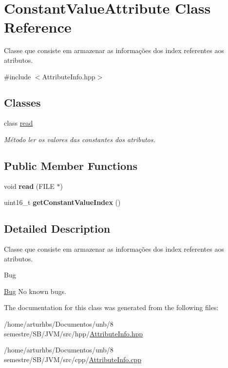 \hypertarget{classConstantValueAttribute}{}\section{Constant\+Value\+Attribute Class Reference}
\label{classConstantValueAttribute}


Classe que consiste em armazenar as informações dos index referentes aos atributos.  




{\ttfamily \#include $<$Attribute\+Info.\+hpp$>$}

\subsection*{Classes}
\begin{DoxyCompactItemize}
\item 
class \hyperlink{classConstantValueAttribute_1_1read}{read}
\begin{DoxyCompactList}\small\item\em Método ler os valores das constantes dos atributos. \end{DoxyCompactList}\end{DoxyCompactItemize}
\subsection*{Public Member Functions}
\begin{DoxyCompactItemize}
\item 
void {\bfseries read} (F\+I\+LE $\ast$)\hypertarget{classConstantValueAttribute_a736510ad35810b8b06b7fed1065b5f9f}{}\label{classConstantValueAttribute_a736510ad35810b8b06b7fed1065b5f9f}

\item 
uint16\+\_\+t {\bfseries get\+Constant\+Value\+Index} ()\hypertarget{classConstantValueAttribute_ab8f66dc68583f523e052482f14e44c9d}{}\label{classConstantValueAttribute_ab8f66dc68583f523e052482f14e44c9d}

\end{DoxyCompactItemize}


\subsection{Detailed Description}
Classe que consiste em armazenar as informações dos index referentes aos atributos. 

\begin{DoxyRefDesc}{Bug}
\item[\hyperlink{bug__bug000002}{Bug}]No known bugs. \end{DoxyRefDesc}


The documentation for this class was generated from the following files\+:\begin{DoxyCompactItemize}
\item 
/home/arturhbs/\+Documentos/unb/8 semestre/\+S\+B/\+J\+V\+M/src/hpp/\hyperlink{AttributeInfo_8hpp}{Attribute\+Info.\+hpp}\item 
/home/arturhbs/\+Documentos/unb/8 semestre/\+S\+B/\+J\+V\+M/src/cpp/\hyperlink{AttributeInfo_8cpp}{Attribute\+Info.\+cpp}\end{DoxyCompactItemize}
